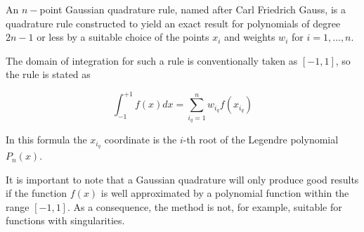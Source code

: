 An $n-$point Gaussian quadrature rule, named after Carl Friedrich Gauss, is a quadrature rule constructed
to yield an exact result for polynomials of degree $2n-1$ or less by a suitable choice of the points $x_i$
and weights $w_i$ for $i=1,\dots,n$.

The domain of integration for such a rule is conventionally taken as $[-1,1]$, so the rule is stated as
\begin{mdframed}[backgroundcolor=blue!5]
\[
\int_{-1}^{+1} f(x) dx = \sum_{i_q=1}^n w_{i_q} f(x_{i_q})
\]
\end{mdframed}
In this formula the $x_{i_q}$ coordinate is 
the $i$-th root of the Legendre polynomial $P_n(x)$. 

It is important to note that a Gaussian quadrature will only produce good results if the function $f(x)$
is well approximated by a polynomial function within the range $[-1,1]$.
As a consequence, the method is not, for example, suitable for functions with singularities.


